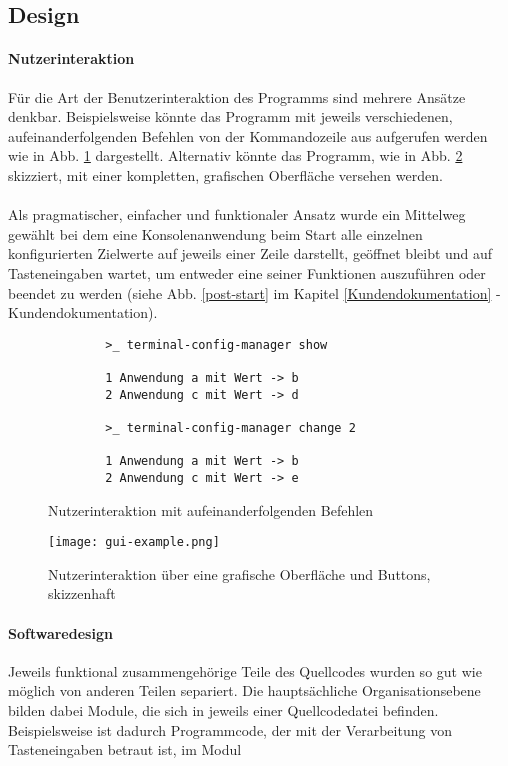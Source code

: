 \subsection{Design}
\paragraph{Nutzerinteraktion}
Für die Art der Benutzerinteraktion des Programms sind mehrere Ansätze denkbar.
Beispielsweise könnte das Programm mit jeweils verschiedenen, aufeinanderfolgenden
Befehlen von der Kommandozeile aus aufgerufen werden wie in Abb. \ref{simple-gui-example}
dargestellt. Alternativ könnte das Programm, wie in Abb. \ref{graphical-gui-example} skizziert,
mit einer kompletten, grafischen Oberfläche versehen werden.

\paragraph{}
Als pragmatischer, einfacher und funktionaler Ansatz wurde ein Mittelweg gewählt
bei dem eine Konsolenanwendung beim Start alle einzelnen konfigurierten
Zielwerte auf jeweils einer Zeile darstellt, geöffnet bleibt und auf Tasteneingaben
wartet, um entweder eine seiner Funktionen auszuführen oder beendet zu werden (siehe Abb. \ref{post-start}
im Kapitel \ref{Kundendokumentation} - Kundendokumentation).


\begin{figure}
    \caption{Nutzerinteraktion mit aufeinanderfolgenden Befehlen}
    \label{simple-gui-example}
    \begin{verbatim}
        >_ terminal-config-manager show
    
        1 Anwendung a mit Wert -> b
        2 Anwendung c mit Wert -> d
    
        >_ terminal-config-manager change 2
    
        1 Anwendung a mit Wert -> b
        2 Anwendung c mit Wert -> e
    \end{verbatim}
\end{figure}

\begin{figure}
    \caption{Nutzerinteraktion über eine grafische Oberfläche und Buttons, skizzenhaft}
    \label{graphical-gui-example}
    \centering\texttt{[image: gui-example.png]}
\end{figure}

\paragraph{Softwaredesign} \label{par:softwaredesign}
Jeweils funktional zusammengehörige Teile des Quellcodes wurden so gut wie möglich
von anderen Teilen separiert. Die hauptsächliche Organisationsebene bilden dabei
Module, die sich in jeweils einer Quellcodedatei befinden. Beispielsweise ist dadurch
Programmcode, der mit der Verarbeitung von Tasteneingaben betraut ist, im Modul

